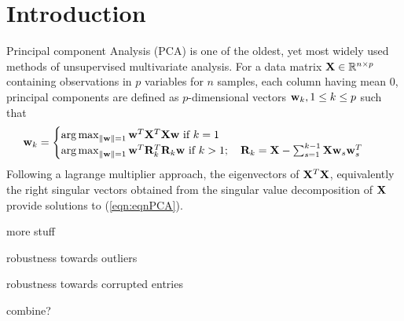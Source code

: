 \section{Introduction}

Principal component Analysis (PCA) is one of the oldest, yet most widely used methods of unsupervised multivariate analysis. For a data matrix ${\mathbf{X}} \in {\mathbb{R}}^{n \times p}$ containing observations in $p$ variables for $n$ samples, each column having mean 0, principal components are defined as $p$-dimensional vectors ${\bf{w}}_k, 1 \leq k \leq p$ such that
%
\begin{align}\label{eqn:eqnPCA}
{\bf{w}}_k &=
\begin{cases}
\operatorname*{arg\,max}_{\| {\bf{w}} \| = 1} {\bf{w}}^T {\mathbf{X}}^T {\mathbf{X}} {\bf{w}} \text{ if }k = 1\\
\operatorname*{arg\,max}_{\| {\bf{w}} \| = 1} {\bf{w}}^T {\mathbf{R}}_k^T {\mathbf{R}}_k {\bf{w}} \text{ if }k > 1;
\quad {\mathbf{R}}_k = {\mathbf{X}} - \sum_{s=1}^{k-1} {\mathbf{X}} {\bf{w}}_s {\bf{w}}_s^T
\end{cases} 
\end{align}
%
Following a lagrange multiplier approach, the eigenvectors of ${\mathbf{X}}^T {\mathbf{X}}$, equivalently the right singular vectors obtained from the singular value decomposition of ${\mathbf{X}}$ provide solutions to (\ref{eqn:eqnPCA}).

{\colrbf more stuff}

{\colrbf robustness towards outliers}

{\colrbf robustness towards corrupted entries}

{\colrbf combine?}
